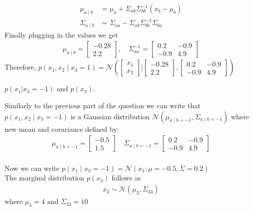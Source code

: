 \documentclass[solution,addpoints,12pt]{exam}
\begin{document}
\begin{questions}
\begin{parts}
\begin{subparts}
\begin{solution}
\begin{align*}
  	\mu_{a\mid b} &= \mu_a + \Sigma_{ab}\Sigma_{bb}^{-1}(x_b-\mu_b)\\
  	\Sigma_{a\mid b} &= \Sigma_{aa}-\Sigma_{ab}\Sigma_{bb}^{-1}\Sigma_{ba}
  \end{align*}
  Finally plugging in the values we get
  \begin{align*}
	\mu_{a\mid b} = \begin{bmatrix}
		-0.28\\
		2.2
	\end{bmatrix},\quad \Sigma_{aa}^{-1}=\begin{bmatrix}
	0.2 & -0.9\\
	-0.9 & 4.9
	\end{bmatrix}
  \end{align*}
  Therefore, $p(x_1, x_2\mid x_3=1)=\mathcal{N}\left(\left[\begin{array}{c}x_1\\x_2\end{array}\right]\bigg | \begin{bmatrix}
  	-0.28\\
  	2.2
  \end{bmatrix},\begin{bmatrix}
  0.2 & -0.9\\
  -0.9 & 4.9
  \end{bmatrix} \right)$
\end{solution}
\subpart[1] $p(x_1 | x_3 = -1)$ and $p(x_3)$.
\begin{solution} Similarly to the previous part of the question we can write that $p(x_1, x_2\mid x_3=-1)$ is a Gaussian distribution $\mathcal{N}\left(\mu_{a\mid b=-1}, \Sigma_{a\mid b=-1}\right)$ where new mean and covariance defined by: \begin{align*}
		\mu_{a\mid b=-1}=\begin{bmatrix}-0.5\\
			1.5
		\end{bmatrix}\quad\Sigma_{a\mid b=-1} = \begin{bmatrix}
		0.2 & -0.9\\
		-0.9 & 4.9
		\end{bmatrix}
	\end{align*}  \\
	Now we can write $p(x_1\mid x_3=-1)=\mathcal{N}\left(x_1;\mu=-0.5,\Sigma=0.2\right)$\\
	The marginal distribution $p(x_3)$ follows as
	\begin{align*}
		x_3 \sim \mathcal{N}\left(\mu_3,\Sigma_{33}\right)
	\end{align*}
	where $\mu_3=4 \text{ and }\Sigma_{33} =10$
\end{solution}
\end{subparts}


\end{parts}
\end{questions}
\end{document}
